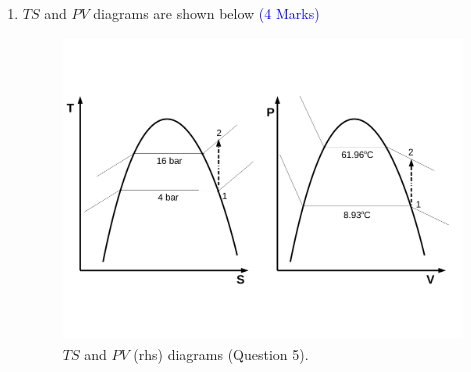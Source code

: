 \documentclass[12pt,twoside]{report}
\begin{document}
\begin{description}
\begin{enumerate}
\item $TS$ and $PV$ diagrams are shown below \textcolor{blue}{(4 Marks)}
\begin{figure}[h]
\label{Ex02:Q05}
\begin{center}
\includegraphics[width=12.0cm,height=8.0cm]{./Pics/Exam_PV-TS_Diagrams}
\caption{$TS$ and $PV$ (rhs) diagrams (Question 5).}
\end{center}
\end{figure}

\end{enumerate}

\end{description}

%
%
%
%
\end{document}
